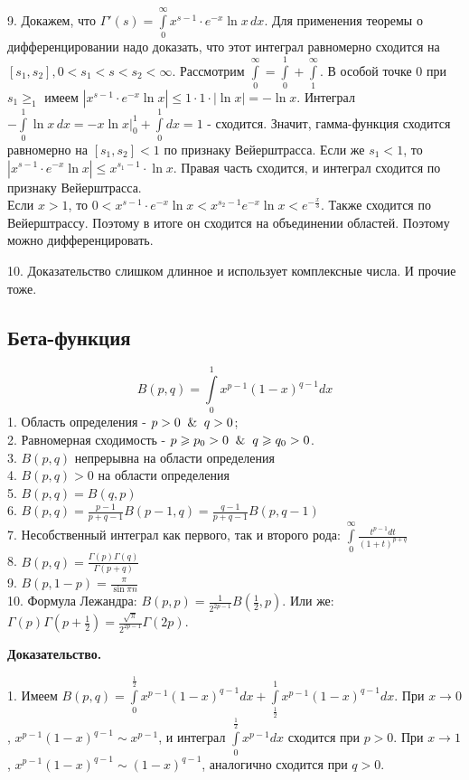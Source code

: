9. Докажем, что 
$\Gamma'(s)=\int\limits_{0}^{\infty}x^{s-1}\cdot e^{-x}\ln x\,dx$. Для 
применения теоремы о дифференцировании надо доказать,
что этот интеграл равномерно сходится на $[s_1,s_2],0<s_1<s<s_2<\infty$. 
Рассмотрим
$\int\limits_{0}^{\infty} = \int\limits_{0}^{1} + \int\limits_{1}^{\infty}$.
В особой точке 0 при $s_1\geqslant_1$ имеем
$|x^{s-1}\cdot e^{-x}\ln x|\leqslant 1\cdot 1\cdot |\ln x|=-\ln x$. 
Интеграл $-\int\limits_{0}^{1}\ln x\,dx=-x\ln x\big|^1_0+
\int\limits_{0}^{1}dx=1$ - сходится. Значит, гамма-функция сходится равномерно
на $[s_1,s_2]<1$ по признаку Вейерштрасса. Если же $s_1<1$, то
$|x^{s-1}\cdot e^{-x}\ln x|\leqslant x^{s_1-1}\cdot\ln x$. 
Правая часть сходится, и интеграл сходится по признаку Вейерштрасса.\\
Если $x>1$, то  $0<x^{s-1}\cdot e^{-x}\ln x<x^{s_2-1}e^{-x}\ln x
<e^{-\frac{x}{3}}$. Также сходится по Вейерштрассу. Поэтому в итоге он сходится
на объединении областей. Поэтому можно дифференцировать.

10. Доказательство слишком длинное и использует комплексные числа. И прочие 
тоже. 

\subsection{Бета-функция}
$$B(p,q)=\int\limits_{0}^{1} x^{p-1}(1-x)^{q-1}dx$$ 
1. Область определения - $p>0\And q>0$;\\
2. Равномерная сходимость -  $p\geqslant p_0>0\And q\geqslant q_0>0$.\\
3. $B(p,q)$ непрерывна на области определения\\
4. $B(p,q)>0$  на области определения\\
5. $B(p,q)=B(q,p)$\\ 
6. $B(p,q)=\frac{p-1}{p+q-1}B(p-1,q)=\frac{q-1}{p+q-1}B(p,q-1)$ \\
7. Несобственный интеграл как первого, так и второго рода:
$\int\limits_{0}^{\infty} \frac{t^{p-1}dt}{(1+t)^{p+q}}$\\
8. $\boxed{B(p,q)=\frac{\Gamma(p)\Gamma(q)}{\Gamma(p+q)}}$ \\
9. $B(p,1-p)=\frac{\pi}{\sin\pi n}$ \\
10. Формула Лежандра: $\boxed{B(p,p)=
\frac{1}{2^{2p-1}}B\left(\frac{1}{2},p\right)}$.
Или же: $\Gamma(p)\Gamma(p+\frac{1}{2})=\frac{\sqrt{\pi}}{2^{2p-1}}\Gamma(2p)$.

\textbf{Доказательство.}

1. Имеем  $B(p,q)=\int\limits_{0}^{\frac{1}{2}}x^{p-1}(1-x)^{q-1}dx+
\int\limits_{\frac{1}{2}}^{1}x^{p-1}(1-x)^{q-1}dx$. При $x\to 0$,
$x^{p-1}(1-x)^{q-1}\sim x^{p-1}$, и интеграл  $\int\limits_{0}^{\frac{1}{2}}
x^{p-1}dx$ сходится при $p>0$. При  $x\to 1$, 
$x^{p-1}(1-x)^{q-1}\sim(1-x)^{q-1}$, аналогично сходится при  $q>0$. 


